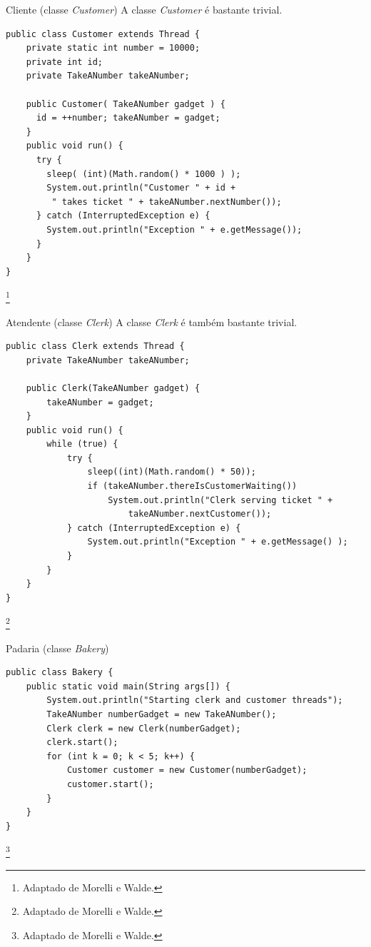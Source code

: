 \documentclass[11pt,justified]{beamer}
\newcommand\blfootnote[1]{%
  \begingroup
  \renewcommand\thefootnote{}\footnote{#1}%
  \addtocounter{footnote}{-1}%
  \endgroup
}
\begin{document}
\begin{frame}[fragile]{Cliente (classe \textit{Customer})}
    A classe \textit{Customer} é bastante trivial.
    \begin{lstlisting}
public class Customer extends Thread {
    private static int number = 10000;
    private int id;
    private TakeANumber takeANumber;
  
    public Customer( TakeANumber gadget ) {
      id = ++number; takeANumber = gadget;
    }
    public void run() {
      try {
        sleep( (int)(Math.random() * 1000 ) );
        System.out.println("Customer " + id +
         " takes ticket " + takeANumber.nextNumber());
      } catch (InterruptedException e) {
        System.out.println("Exception " + e.getMessage());
      }
    }
}
    \end{lstlisting}\blfootnote{Adaptado de Morelli e Walde.}
\end{frame}

\begin{frame}[fragile]{Atendente (classe \textit{Clerk})}
    A classe \textit{Clerk} é também bastante trivial.
    \begin{lstlisting}
public class Clerk extends Thread {
    private TakeANumber takeANumber;

    public Clerk(TakeANumber gadget) {
        takeANumber = gadget;
    }
    public void run() {
        while (true) {
            try {
                sleep((int)(Math.random() * 50));
                if (takeANumber.thereIsCustomerWaiting())
                    System.out.println("Clerk serving ticket " +
                        takeANumber.nextCustomer());
            } catch (InterruptedException e) {
                System.out.println("Exception " + e.getMessage() );
            }
        }
    }
}
    \end{lstlisting}\blfootnote{Adaptado de Morelli e Walde.}
\end{frame}

\begin{frame}[fragile]{Padaria (classe \textit{Bakery})}
    \begin{lstlisting}
public class Bakery {
    public static void main(String args[]) {
        System.out.println("Starting clerk and customer threads");
        TakeANumber numberGadget = new TakeANumber();
        Clerk clerk = new Clerk(numberGadget);
        clerk.start();
        for (int k = 0; k < 5; k++) {
            Customer customer = new Customer(numberGadget);
            customer.start();
        }
    }
}
    \end{lstlisting}\blfootnote{Adaptado de Morelli e Walde.}
\end{frame}
\end{document}
